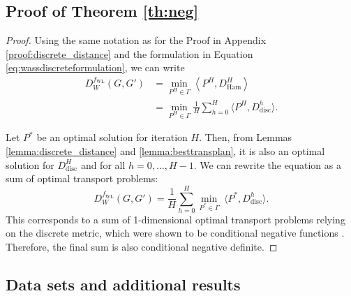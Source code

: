 \documentclass{article}
\begin{document}
\subsection{Proof of Theorem \ref{th:neg}}
\label{proof:theorem}
\begin{proof}
Using the same notation as for the Proof in Appendix \ref{proof:discrete_distance} and the formulation in Equation \ref{eq:wassdiscreteformulation}, we can write
\begin{align*}
D^{f_{\mathrm{\scriptscriptstyle{WL}}}}_W(G,G') &= \min_{P^H \in \Gamma} \left \langle P^H, D_{\mathrm{Ham}}^H\right \rangle \\
 &= \min_{P^H \in \Gamma} \frac{1}{H}\sum_{h=0}^H\langle P^H,  D_{\mathrm{disc}}^h \rangle.
\end{align*}

Let $P^*$ be an optimal solution for iteration $H$. Then, from Lemmas \ref{lemma:discrete_distance} and \ref{lemma:besttransplan}, it is also an optimal solution for $D^H_{\mathrm{disc}}$ and for all $h=0,\ldots,H-1$. We can rewrite the equation as a sum of optimal transport problems:
\begin{equation}
D^{f_{\mathrm{\scriptscriptstyle{WL}}}}_W(G,G') = \frac{1}{H} \sum_{h=0}^H \min_{P^* \in \Gamma} \:\langle P^*, D_{\mathrm{disc}}^h \rangle.
\end{equation}
This corresponds to a sum of 1-dimensional optimal transport problems relying on the discrete metric, which were shown to be conditional negative functions \citep{gardner2017definiteness}. Therefore, the final sum is also conditional negative definite.
\end{proof} 



\subsection{Data sets and additional results}
\label{app:additional_ds}
\end{document}
